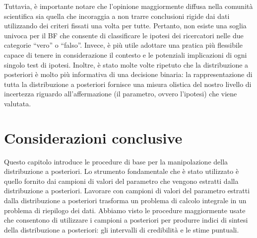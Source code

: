 \documentclass[
  11pt,
  italian,
  a4paper,
  extrafontsizes,onecolumn,openright
  ]{memoir}
\makeatletter
\newcommand{\MemoirChapStyle}{daleif1}
\newcommand{\MemoirPageStyle}{Ruled}
\newlength\widthw %
\newcommand*{\SmallMargins}{
  \setlrmarginsandblock{1.5in}{1.5in}{*}
  \setmarginnotes{0.1in}{0.1in}{0.1in}
 \setulmarginsandblock{1.5in}{1in}{*}
  \checkandfixthelayout
  \ch@ngetext
  \clearpage
  \setlength{\widthw}{\textwidth+\marginparsep+\marginparwidth}
  \footnotesatfoot
  \chapterstyle{\MemoirChapStyle}  %
  \pagestyle{\MemoirPageStyle}
}
\newcommand{\LargeMargins}{\SmallMargins}
\makeatother
\begin{document}
Tuttavia, è importante notare che l'opinione maggiormente diffusa nella comunità scientifica sia quella che incoraggia a non trarre conclusioni rigide dai dati utilizzando dei criteri fissati una volta per tutte. Pertanto, non esiste una soglia univoca per il BF che consente di classificare le ipotesi dei ricercatori nelle due categorie ``vero'' o ``falso''. Invece, è più utile adottare una pratica più flessibile capace di tenere in considerazione il contesto e le potenziali implicazioni di ogni singolo test di ipotesi. Inoltre, è stato molte volte ripetuto che la distribuzione a posteriori è molto più informativa di una decisione binaria: la rappresentazione di tutta la distribuzione a posteriori fornisce una misura olistica del nostro livello di incertezza riguardo all'affermazione (il parametro, ovvero l'ipotesi) che viene valutata.

\hypertarget{considerazioni-conclusive}{%
\section*{Considerazioni conclusive}\label{considerazioni-conclusive}}

Questo capitolo introduce le procedure di base per la manipolazione
della distribuzione a posteriori. Lo strumento fondamentale che è stato
utilizzato è quello fornito dai campioni di valori del parametro che vengono estratti dalla distribuzione a posteriori. Lavorare con campioni di valori del parametro estratti dalla distribuzione a posteriori trasforma un problema di calcolo integrale in un problema di riepilogo dei dati. Abbiamo visto le procedure maggiormente usate che consentono di utilizzare i campioni a
posteriori per produrre indici di sintesi della distribuzione a
posteriori: gli intervalli di credibilità e le stime puntuali.



\backmatter
\SmallMargins

\printbibliography
\onecolumn




\cleardoublepage
\LargeMargins
\listoffigures


\end{document}

